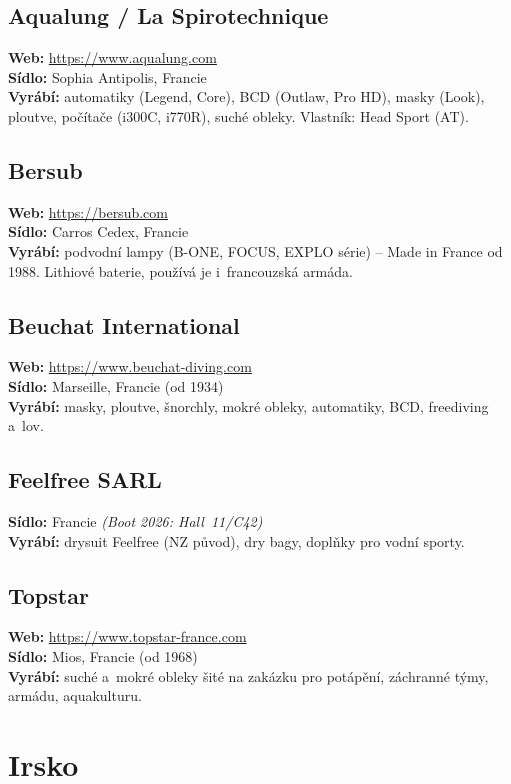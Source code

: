 \documentclass[11pt,a4paper]{article}
\begin{document}
\subsection{Aqualung / La Spirotechnique}
\textbf{Web:} \url{https://www.aqualung.com} \\
\textbf{Sídlo:} Sophia Antipolis, Francie \\
\textbf{Vyrábí:} automatiky (Legend, Core), BCD (Outlaw, Pro HD), masky (Look), ploutve, počítače (i300C, i770R), suché obleky. Vlastník: Head Sport (AT).

\subsection{Bersub}
\textbf{Web:} \url{https://bersub.com} \\
\textbf{Sídlo:} Carros Cedex, Francie \\
\textbf{Vyrábí:} podvodní lampy (B-ONE, FOCUS, EXPLO série) -- Made in France od 1988. Lithiové baterie, používá je i~francouzská armáda.

\subsection{Beuchat International}
\textbf{Web:} \url{https://www.beuchat-diving.com} \\
\textbf{Sídlo:} Marseille, Francie (od 1934) \\
\textbf{Vyrábí:} masky, ploutve, šnorchly, mokré obleky, automatiky, BCD, freediving a~lov.

\subsection{Feelfree SARL}
\textbf{Sídlo:} Francie \quad\emph{(Boot 2026: Hall~11/C42)} \\
\textbf{Vyrábí:} drysuit Feelfree (NZ původ), dry bagy, doplňky pro vodní sporty.

\subsection{Topstar}
\textbf{Web:} \url{https://www.topstar-france.com} \\
\textbf{Sídlo:} Mios, Francie (od 1968) \\
\textbf{Vyrábí:} suché a~mokré obleky šité na zakázku pro potápění, záchranné týmy, armádu, aquakulturu.

\section{Irsko}
\end{document}
